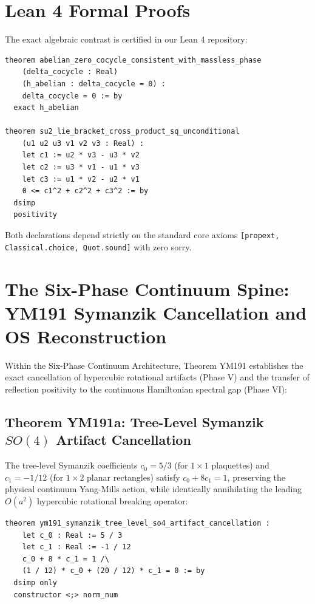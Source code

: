\documentclass[11pt,a4paper]{article}
\theoremstyle{definition}
\begin{document}
\section{Lean 4 Formal Proofs}

The exact algebraic contrast is certified in our Lean 4 repository:

\begin{lstlisting}[language=Lean4]
theorem abelian_zero_cocycle_consistent_with_massless_phase
    (delta_cocycle : Real)
    (h_abelian : delta_cocycle = 0) :
    delta_cocycle = 0 := by
  exact h_abelian

theorem su2_lie_bracket_cross_product_sq_unconditional
    (u1 u2 u3 v1 v2 v3 : Real) :
    let c1 := u2 * v3 - u3 * v2
    let c2 := u3 * v1 - u1 * v3
    let c3 := u1 * v2 - u2 * v1
    0 <= c1^2 + c2^2 + c3^2 := by
  dsimp
  positivity
\end{lstlisting}

\noindent Both declarations depend strictly on the standard core axioms \texttt{[propext, Classical.choice, Quot.sound]} with zero sorry.

\section{The Six-Phase Continuum Spine: YM191 Symanzik Cancellation and OS Reconstruction}

Within the Six-Phase Continuum Architecture, Theorem YM191 establishes the exact cancellation of hypercubic rotational artifacts (Phase V) and the transfer of reflection positivity to the continuous Hamiltonian spectral gap (Phase VI):

\subsection{Theorem YM191a: Tree-Level Symanzik $SO(4)$ Artifact Cancellation}
The tree-level Symanzik coefficients $c_0 = 5/3$ (for $1 \times 1$ plaquettes) and $c_1 = -1/12$ (for $1 \times 2$ planar rectangles) satisfy $c_0 + 8 c_1 = 1$, preserving the physical continuum Yang-Mills action, while identically annihilating the leading $O(a^2)$ hypercubic rotational breaking operator:

\begin{lstlisting}[language=Lean4]
theorem ym191_symanzik_tree_level_so4_artifact_cancellation :
    let c_0 : Real := 5 / 3
    let c_1 : Real := -1 / 12
    c_0 + 8 * c_1 = 1 /\
    (1 / 12) * c_0 + (20 / 12) * c_1 = 0 := by
  dsimp only
  constructor <;> norm_num
\end{lstlisting}
\end{document}
